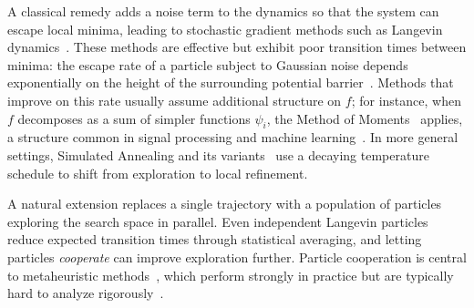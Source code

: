\documentclass{article}
\theoremstyle{plain}
\theoremstyle{definition}
\theoremstyle{remark}
\begin{document}
A classical remedy adds a noise term to the dynamics so that the system can escape local minima, leading to stochastic gradient methods such as Langevin dynamics~\cite{CoffeyKalmykovWaldron2004}. These methods are effective but exhibit poor transition times between minima: the escape rate of a particle subject to Gaussian noise depends exponentially on the height of the surrounding potential barrier~\cite{berglund2011kramers}. Methods that improve on this rate usually assume additional structure on \(f\); for instance, when \(f\) decomposes as a sum of simpler functions \(\psi_i\), the Method of Moments~\cite{meziat2003method} applies, a structure common in signal processing and machine learning~\cite{shao1993signal}. In more general settings, Simulated Annealing and its variants~\cite{bolte2024swarm,xu2018global} use a decaying temperature schedule to shift from exploration to local refinement.

A natural extension replaces a single trajectory with a population of particles exploring the search space in parallel. Even independent Langevin particles reduce expected transition times through statistical averaging, and letting particles \emph{cooperate} can improve exploration further. Particle cooperation is central to metaheuristic methods~\cite{bandaru2016metaheuristic,yang2020nature}, which perform strongly in practice but are typically hard to analyze rigorously~\cite{hussain2019metaheuristic,rajwar2023exhaustive}.
\end{document}
